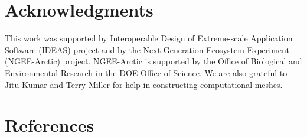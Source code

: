 \documentclass[review,11pt]{elsarticle}
\begin{document}
\section*{Acknowledgments} 

This work was supported by Interoperable Design of Extreme-scale Application Software (IDEAS) project and by the Next Generation Ecosystem Experiment
(NGEE-Arctic) project. NGEE-Arctic is supported by the Office of Biological and Environmental Research in the DOE Office of Science. We are also grateful to Jitu Kumar and Terry Miller for help in constructing computational meshes. 
\section*{References}


\end{document}
